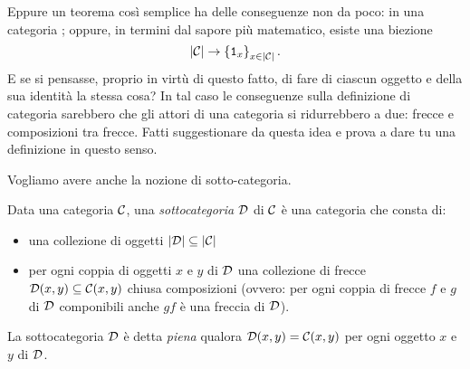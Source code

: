
\begin{esercizio}
Eppure un teorema così semplice ha delle conseguenze non da poco: in una categoria ; oppure, in termini dal sapore più matematico, esiste una biezione
\[\lvert\mathcal C\rvert \to \left\{\mathtt{1}_x\right\}_{x \in \lvert\mathcal C\rvert} .\]
E se si pensasse, proprio in virtù di questo fatto, di fare di ciascun oggetto e della sua identità la stessa cosa? In tal caso le conseguenze sulla definizione di categoria sarebbero che gli attori di una categoria si ridurrebbero a due: frecce e composizioni tra frecce. Fatti suggestionare da questa idea e prova a dare tu una definizione in questo senso.
\end{esercizio}

Vogliamo avere anche la nozione di sotto-categoria.

\begin{definizione}[Sottocategorie]
Data una categoria \(\mathcal C\), una {\em sottocategoria} \(\mathcal D\) di \(\mathcal C\) è una categoria che consta di:
\begin{itemize}
\item una collezione di oggetti \(\lvert\mathcal D\rvert\subseteq\lvert\mathcal C\rvert\)
\item per ogni coppia di oggetti \(x\) e \(y\) di \(\mathcal D\) una collezione di frecce \(\mathcal D(x,y) \subseteq \mathcal C(x,y)\) chiusa composizioni (ovvero: per ogni coppia di frecce \(f\) e \(g\) di \(\mathcal D\) componibili anche \(gf\) è una freccia di \(\mathcal D\)).
\end{itemize}
La sottocategoria \(\mathcal D\) è detta {\em piena} qualora \(\mathcal D(x,y)=\mathcal C(x,y)\) per ogni oggetto \(x\) e \(y\) di \(\mathcal D\).
\end{definizione}
